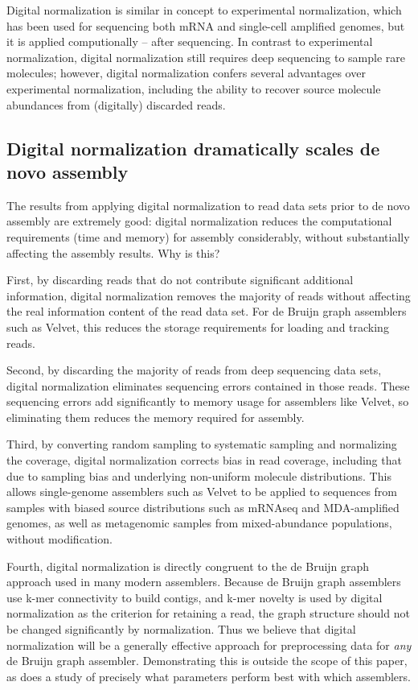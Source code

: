\documentclass[10pt]{article}
\begin{document}
Digital normalization is similar in concept to experimental
normalization, which has been used for sequencing both mRNA and
single-cell amplified genomes, but it is applied computionally --
after sequencing.  In contrast to experimental normalization, digital
normalization still requires deep sequencing to sample rare molecules;
however, digital normalization confers several advantages over
experimental normalization, including the ability to recover source
molecule abundances from (digitally) discarded reads.

\subsection*{Digital normalization dramatically scales de novo assembly}

The results from applying digital normalization to read data sets
prior to de novo assembly are extremely good: digital normalization
reduces the computational requirements (time and memory) for assembly
considerably, without substantially affecting the assembly results.
Why is this?

First, by discarding reads that do not contribute significant
additional information, digital normalization removes the majority of
reads without affecting the real information content of the read data
set.  For de Bruijn graph assemblers such as Velvet, this reduces the
storage requirements for loading and tracking reads.

Second, by discarding the majority of reads from deep sequencing data
sets, digital normalization eliminates sequencing errors contained in
those reads.  These sequencing errors add significantly to memory
usage for assemblers like Velvet, so eliminating them reduces the
memory required for assembly.

Third, by converting random sampling to systematic sampling and
normalizing the coverage, digital normalization corrects bias in read
coverage, including that due to sampling bias and underlying
non-uniform molecule distributions.  This allows single-genome
assemblers such as Velvet to be applied to sequences from samples with
biased source distributions such as mRNAseq and MDA-amplified genomes,
as well as metagenomic samples from mixed-abundance populations,
without modification.

Fourth, digital normalization is directly congruent to the de Bruijn
graph approach used in many modern assemblers.  Because de Bruijn
graph assemblers use k-mer connectivity to build contigs, and k-mer
novelty is used by digital normalization as the criterion for
retaining a read, the graph structure should not be changed
significantly by normalization.  Thus we believe that digital
normalization will be a generally effective approach for preprocessing
data for {\em any} de Bruijn graph assembler.  Demonstrating this is
outside the scope of this paper, as does a study of precisely what
parameters perform best with which assemblers.
\end{document}
